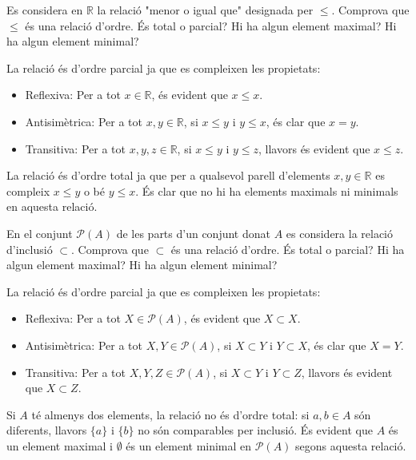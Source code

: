 \begin{exercici}
Es considera en $\mathbb{R}$ la relació "menor o igual que" designada
per $\leq $. Comprova que $\leq $ és una relació d'ordre. És
total o parcial? Hi ha algun element maximal? Hi ha algun element minimal?
\end{exercici}

\begin{solucio}
La relació és d'ordre parcial ja que es compleixen les propietats:

\begin{itemize}
\item Reflexiva: Per a tot $x\in \mathbb{R}$, és evident que $x\leq x$.

\item Antisimètrica: Per a tot $x,y\in \mathbb{R}$, si $x\leq y$ i $
y\leq x$, és clar que $x=y$.

\item Transitiva: Per a tot $x,y,z\in \mathbb{R}$, si $x\leq y$ i $y\leq z$,
llavors és evident que $x\leq z$.
\end{itemize}

La relació és d'ordre total ja que per a qualsevol parell d'elements
$x,y\in \mathbb{R}$ es compleix $x\leq y$ o bé $y\leq x$. És clar
que no hi ha elements maximals ni minimals en aquesta relació.
\end{solucio}

\begin{exercici}
En el conjunt $\mathcal{P}(A)$ de les parts d'un conjunt donat $A$ es
considera la relació d'inclusió $\subset $. Comprova que $\subset $
és una relació d'ordre. És total o parcial? Hi ha algun element
maximal? Hi ha algun element minimal?
\end{exercici}

\begin{solucio}
La relació és d'ordre parcial ja que es compleixen les propietats:

\begin{itemize}
\item Reflexiva: Per a tot $X\in \mathcal{P}(A)$, és evident que $%
X\subset X$.

\item Antisimètrica: Per a tot $X,Y\in \mathcal{P}(A)$, si $X\subset Y$
i $Y\subset X$, és clar que $X=Y$.

\item Transitiva: Per a tot $X,Y,Z\in \mathcal{P}(A)$, si $X\subset Y$ i $
Y\subset Z$, llavors és evident que $X\subset Z$.
\end{itemize}

Si $A$ té almenys dos elements, la relació no és d'ordre total: si $a,b\in A$ són diferents, llavors $\{a\}$ i $\{b\}$ no són comparables per inclusió. És evident que $A$ és un
element maximal i $\emptyset $ és un element minimal en $\mathcal{P}(A)$
segons aquesta relació.
\end{solucio}

